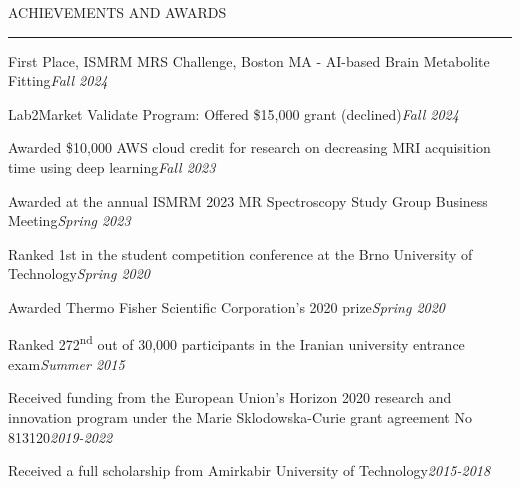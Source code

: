 \documentclass{resume} %
\renewenvironment{rSection}[1]{
\sectionskip
\textcolor{RoyalPurple}{\MakeUppercase{#1}}
\sectionlineskip
\hrule
\begin{list}{}{
\setlength{\leftmargin}{1.5em}
}
\item[]
}{
\end{list}
}
\begin{document}
\begin{rSection}{Achievements and Awards} \itemsep -2pt
\begin{rSubsection}{}{}{}{}
\item  {First Place, ISMRM MRS Challenge, Boston MA - AI-based Brain Metabolite Fitting}\hfill {\em Fall 2024}
\item  {Lab2Market Validate Program: Offered \$15,000 grant (declined)}\hfill {\em Fall 2024} 
\item  {Awarded \$10,000 AWS cloud credit for research on decreasing MRI acquisition time using deep learning}\hfill {\em Fall 2023} 
\item {Awarded at the annual ISMRM 2023 MR Spectroscopy Study Group Business Meeting}\hfill {\em Spring 2023} 
\item {Ranked 1st in the student competition conference at the Brno University of Technology}\hfill {\em Spring 2020} 
\item {Awarded Thermo Fisher Scientific Corporation’s 2020 prize}\hfill {\em Spring 2020}
\item {Ranked 272\textsuperscript{nd} out of 30,000 participants in the Iranian university entrance exam}\hfill {\em Summer 2015} 
\clearpage
\item{Received funding from the European Union's Horizon 2020 research and innovation program under the Marie Sklodowska-Curie grant agreement No 813120}\hfill {\em 2019-2022} 
\item {Received a full scholarship from Amirkabir University of Technology}\hfill {\em 2015-2018}
\end{rSubsection}
\end{rSection}


\end{document}

